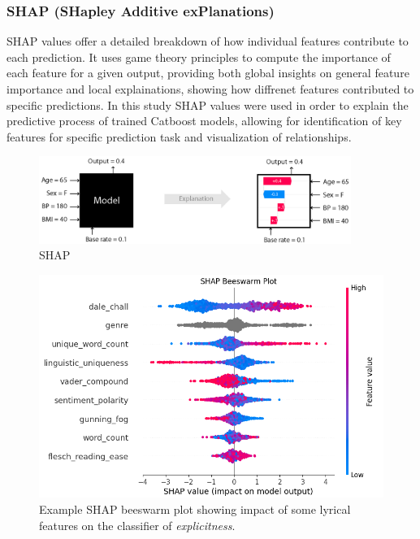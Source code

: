 \subsubsection*{SHAP (SHapley Additive exPlanations)}
SHAP\cite{shap} values offer a detailed  breakdown of how individual features contribute
to  each prediction. It uses game theory principles to compute the importance
of each feature for a given output, providing both global insights on general
feature importance and  local explainations, showing how diffrenet features
contributed to specific predictions. In this study SHAP values were used in
order to explain the predictive process of trained Catboost models, allowing
for identification of key features for specific prediction task and
visualization of relationships.

\begin{center}
  \begin{figure}[H]
  \centering
  \includegraphics[width=4in]{img/shap_intro.png}
  \caption{SHAP\cite{shap}}
  \label{Figure:fig_beh}
\end{figure}
\end{center}

\begin{center}
  \begin{figure}[H]
  \centering
  \includegraphics[width=4.5in]{img/shap_beeswarm.png}
  \caption{Example SHAP beeswarm plot showing impact of some lyrical features
  on the classifier of \textit{explicitness}.}
  \label{Figure:fig_beh}
\end{figure}
\end{center}

